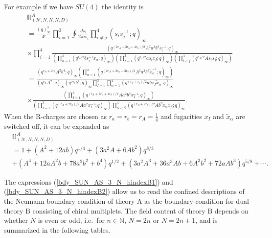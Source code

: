 \documentclass[12pt]{article}
\newcommand{\Nb}{\mathbb{N}}
\numberwithin{equation}{section}
\begin{document}
For example if we have $SU(4)$ the identity is
\begin{align}
&\mathbb{II}_{(\mathcal{N},N,N,N,D)}^{A}
\nonumber\\
&=
\frac{(q)_{\infty}^{3}}{4!} \prod_{i=1}^{3} \oint \frac{ds_i}{2\pi i s_i}
\prod_{i \ne j}^4 (s_i s_j^{-1}; q)_{\infty} \nonumber \\
&\times \prod_{i = 1}^4 \frac{(q^{(2r_A + 3r_a + 4r_b)/2} A^{2} a^3 b^4 s_i^{-1}; q)_{\infty}}{\left( \prod_{\alpha = 1}^4 (q^{r_b/2} b s_i^{-1} \tilde{x}_{\alpha}; q)_{\infty} \right) \left( \prod_{I = 1}^3 (q^{r_a/2} a s_i x_I; q)_{\infty} \right) \left( \prod_{i < j}^4 (q^{r_A/2} A s_i s_j; q)_{\infty} \right)}
\nonumber \\
&=\frac{\left( q^{r_A + 2r_b} A^2 b^4; q \right)_{\infty} \left( \prod_{\alpha = 1}^4 \left( q^{(2r_A + 3r_a + 3r_b)/2} A^{2} a^3 b^{3} \tilde{x}_{\alpha}^{-1};q \right)_{\infty} \right)}
 {\left( q^{r_A} A^2; q \right)_{\infty} \left( q^{2r_b} b^4; q \right)_{\infty} \prod_{I = 1}^3 \prod_{\alpha = 1}^4 (q^{(r_a + r_b)/2} ab x_I \tilde{x}_{\alpha}; q)_{\infty}}
\nonumber \\
&\times \frac{\left( \prod_{I = 1}^3 \left( q^{(r_A + 2r_a + 4r_b)/2} A a^2 b^4 x_I^{-1};q \right)_{\infty} \right)}
 {\left( \prod_{I = 1}^3 \left( q^{(r_A + 2r_a)/2} A a^2 x_I^{-1}; q \right)_{\infty} \right) \prod_{\alpha < \beta}^4 (q^{(r_A + 2r_b)/2} A b^2 \tilde{x}_{\alpha} \tilde{x}_{\beta}; q)_{\infty}}
\label{GR_su4}. 
\end{align}
When the R-charges are chosen as $r_a=r_b=r_A=\frac14$ and fugacities $x_I$ and $\tilde{x}_{\alpha}$ are switched off, 
it can be expanded as
\begin{align}
&
\mathbb{II}_{(\mathcal{N},N,N,N,D)}^{A}
\nonumber\\
&=1+(A^2+12ab)q^{1/4}
+(3a^2A+6Ab^2)q^{8/3}
\nonumber\\
&+(A^4+12aA^2b+78a^2b^2+b^4)q^{1/2}
+(3a^2A^3+36a^3Ab+6A^3b^2+72aAb^3)q^{5/8}+\cdots.
\end{align}

The expressions (\ref{bdy_SUN_AS_3_N_hindexB1}) and (\ref{bdy_SUN_AS_3_N_hindexB2}) allow us to read the confined descriptions of the Neumann boundary condition of theory A as the boundary condition for dual theory B consisting of chiral multiplets. 
The field content of theory B depends on whether $N$ is even or odd, i.e.\ for $n \in \Nb$, $N = 2n$ or $N = 2n+1$, and is summarized in the following tables.
\end{document}
